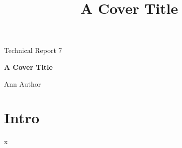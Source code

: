 \documentclass{article}
\title{A Cover Title}
\begin{document}
\begin{titlepage}
\begin{center}
{\large Technical Report 7\par}
\vspace{1cm}
{\Huge\bfseries A Cover Title\par}
\vspace{1cm}
{\Large Ann Author\par}
\end{center}
\end{titlepage}
\section{Intro}
x
\end{document}
